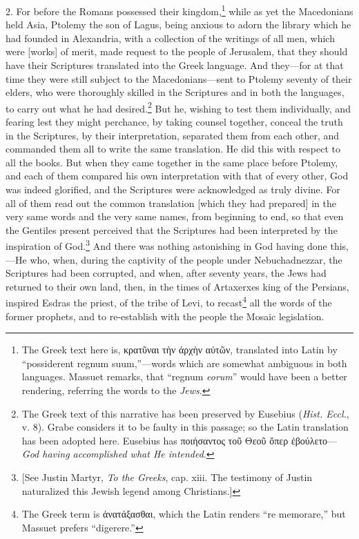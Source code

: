 2. For before the Romans possessed their kingdom,\footnote{The Greek text here is, \textgreek{κρατῦναι τὴν ἀρχὴν αὐτῶν,} translated into Latin by “possiderent regnum suum,”—words which are somewhat ambiguous in both languages. Massuet remarks, that “regnum \emph{eorum}” would have been a better rendering, referring the words to the \emph{Jews}.} while as yet the Macedonians held Asia, Ptolemy the son of Lagus, being anxious to adorn the library which he had founded in Alexandria, with a collection of the writings of all men, which were [works] of merit, made request to the people of Jerusalem, that they should have their Scriptures translated into the Greek language. And they—for at that time they were still subject to the Macedonians—sent to Ptolemy seventy of their elders, who were thoroughly skilled in the Scriptures and in both the languages, to carry out what he had desired.\footnote{The Greek text of this narrative has been preserved by Eusebius (\emph{Hist. Eccl.}, v. 8). Grabe considers it to be faulty in this passage; so the Latin translation has been adopted here. Eusebius has\textgreek{ ποιήσαντος τοῦ Θεοῦ ὄπερ ἐβούλετο}— \emph{God having accomplished what He intended}.} But he, wishing to test them individually, and fearing lest they might perchance, by taking counsel together, conceal the truth in the Scriptures, by their interpretation, separated them from each other, and commanded them all to write the same translation. He did this with respect to all the books. But when they came together in the same place before Ptolemy, and  each of them compared his own interpretation with that of every other, God was indeed glorified, and the Scriptures were acknowledged as truly divine. For all of them read out the common translation [which they had prepared] in the very same words and the very same names, from beginning to end, so that even the Gentiles present perceived that the Scriptures had been interpreted by the inspiration of God.\footnote{[See Justin Martyr, \emph{To the Greeks}, cap. xiii. The testimony of Justin naturalized this Jewish legend among Christians.]} And there was nothing astonishing in God having done this,—He who, when, during the captivity of the people under Nebuchadnezzar, the Scriptures had been corrupted, and when, after seventy years, the Jews had returned to their own land, then, in the times of Artaxerxes king of the Persians, inspired Esdras the priest, of the tribe of Levi, to recast\footnote{The Greek term is \textgreek{ἀνατάξασθαι,} which the Latin renders “re memorare,” but Massuet prefers “digerere.”} all the words of the former prophets, and to re-establish with the people the Mosaic legislation.

